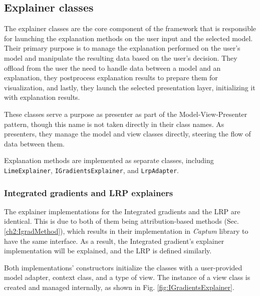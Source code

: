 \documentclass[
    bindingoffset=5mm,  %
    footnoteindent=3mm, %
    hyphenation=true    %
]{src/wut-thesis}
\begin{document}
\subsection{Explainer classes}

The explainer classes are the core component of the framework that is responsible for launching
the explanation methods on the user input and the selected model. Their primary purpose is to manage
the explanation performed on the user's model and manipulate the resulting data based on the user's decision.
They offload from the user the need to handle data between a model and an explanation, they postprocess
explanation results to prepare them for visualization, and lastly,
they launch the selected presentation layer, initializing it with explanation results.  

These classes serve a purpose as presenter as part of the Model-View-Presenter pattern,
though this name is not taken directly in their class names. As presenters,
they manage the model and view classes directly, steering the flow of data between them.

Explanation methods are implemented as separate classes, including \texttt{LimeExplainer},
\texttt{IGradientsExplainer}, and \texttt{LrpAdapter}.

\subsubsection{Integrated gradients and LRP explainers}

The explainer implementations for the Integrated gradients and the LRP are identical.
This is due to both of them being attribution-based methods (Sec. \ref{ch2:IgradMethod}),
which results in their implementation in \emph{Captum} library to have the same interface.
As a result, the Integrated gradient's explainer implementation will be explained,
and the LRP is defined similarly.

Both implementations' constructors initialize the classes with a user-provided model adapter,
context class, and a type of view. The instance of a view class is created and managed internally,
as shown in Fig. \ref{fig:IGradientsExplainer}.
\end{document}

